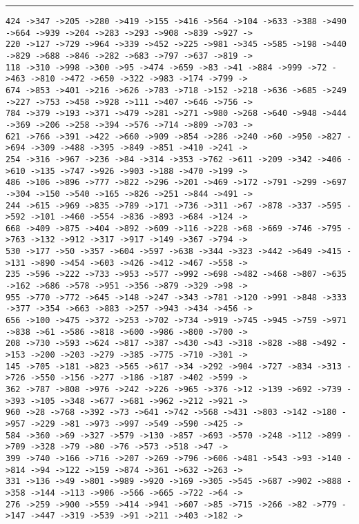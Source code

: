 \documentclass[letter, 12pt]{article}
\newenvironment{question}[1]{%
    \vspace{.2in}%
        \noindent{\bf #1}%
    \vspace{0.3em} \hrule \vspace{.1in}%
}{}
\begin{document}
\begin{question}{\large Appendix}
\begin{lstlisting}[style=CStyle]
424 ->347 ->205 ->280 ->419 ->155 ->416 ->564 ->104 ->633 ->388 ->490 ->664 ->939 ->204 ->283 ->293 ->908 ->839 ->927 ->
220 ->127 ->729 ->964 ->339 ->452 ->225 ->981 ->345 ->585 ->198 ->440 ->829 ->688 ->846 ->282 ->683 ->797 ->637 ->819 ->
118 ->310 ->998 ->300 ->95 ->474 ->659 ->83 ->41 ->884 ->999 ->72 ->463 ->810 ->472 ->650 ->322 ->983 ->174 ->799 ->
674 ->853 ->401 ->216 ->626 ->783 ->718 ->152 ->218 ->636 ->685 ->249 ->227 ->753 ->458 ->928 ->111 ->407 ->646 ->756 ->
784 ->379 ->193 ->371 ->479 ->281 ->271 ->980 ->268 ->640 ->948 ->444 ->369 ->206 ->258 ->394 ->576 ->714 ->809 ->703 ->
621 ->766 ->391 ->422 ->660 ->909 ->854 ->286 ->240 ->60 ->950 ->827 ->694 ->309 ->488 ->395 ->849 ->851 ->410 ->241 ->
254 ->316 ->967 ->236 ->84 ->314 ->353 ->762 ->611 ->209 ->342 ->406 ->610 ->135 ->747 ->926 ->903 ->188 ->470 ->199 ->
486 ->106 ->896 ->777 ->822 ->296 ->201 ->469 ->172 ->791 ->299 ->697 ->304 ->150 ->540 ->165 ->826 ->251 ->844 ->491 ->
244 ->615 ->969 ->835 ->789 ->171 ->736 ->311 ->67 ->878 ->337 ->595 ->592 ->101 ->460 ->554 ->836 ->893 ->684 ->124 ->
668 ->409 ->875 ->404 ->892 ->609 ->116 ->228 ->68 ->669 ->746 ->795 ->763 ->132 ->912 ->317 ->917 ->149 ->367 ->794 ->
530 ->177 ->50 ->357 ->604 ->597 ->638 ->344 ->323 ->442 ->649 ->415 ->131 ->890 ->454 ->603 ->426 ->412 ->467 ->558 ->
235 ->596 ->222 ->733 ->953 ->577 ->992 ->698 ->482 ->468 ->807 ->635 ->162 ->686 ->578 ->951 ->356 ->879 ->329 ->98 ->
955 ->770 ->772 ->645 ->148 ->247 ->343 ->781 ->120 ->991 ->848 ->333 ->377 ->354 ->663 ->883 ->257 ->943 ->434 ->456 ->
656 ->100 ->475 ->372 ->253 ->702 ->734 ->919 ->745 ->945 ->759 ->971 ->838 ->61 ->586 ->818 ->600 ->986 ->800 ->700 ->
208 ->730 ->593 ->624 ->817 ->387 ->430 ->43 ->318 ->828 ->88 ->492 ->153 ->200 ->203 ->279 ->385 ->775 ->710 ->301 ->
145 ->705 ->181 ->823 ->565 ->617 ->34 ->292 ->904 ->727 ->834 ->313 ->726 ->550 ->156 ->277 ->186 ->187 ->402 ->599 ->
362 ->787 ->808 ->976 ->242 ->226 ->965 ->376 ->12 ->139 ->692 ->739 ->393 ->105 ->348 ->677 ->681 ->962 ->212 ->921 ->
960 ->28 ->768 ->392 ->73 ->641 ->742 ->568 ->431 ->803 ->142 ->180 ->957 ->229 ->81 ->973 ->997 ->549 ->590 ->425 ->
584 ->360 ->69 ->327 ->579 ->130 ->857 ->693 ->570 ->248 ->112 ->899 ->709 ->328 ->79 ->80 ->76 ->573 ->518 ->47 ->
399 ->740 ->166 ->716 ->207 ->269 ->796 ->606 ->481 ->543 ->93 ->140 ->814 ->94 ->122 ->159 ->874 ->361 ->632 ->263 ->
331 ->136 ->49 ->801 ->989 ->920 ->169 ->305 ->545 ->687 ->902 ->888 ->358 ->144 ->113 ->906 ->566 ->665 ->722 ->64 ->
276 ->259 ->900 ->559 ->414 ->941 ->607 ->85 ->715 ->266 ->82 ->779 ->147 ->447 ->319 ->539 ->91 ->211 ->403 ->182 ->

\end{lstlisting}
\end{question}
\end{document}
